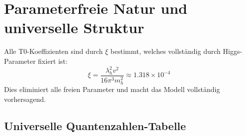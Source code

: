 	\section{Parameterfreie Natur und universelle Struktur}
	\label{sec:parameterfreie_natur}
	
	\begin{important}
		Alle T0-Koeffizienten sind durch $\xi$ bestimmt, welches vollständig durch Higgs-Parameter fixiert ist:
		\begin{equation}
			\xi = \frac{\lambda_h^2 v^2}{16\pi^3 m_h^2} \approx 1.318 \times 10^{-4}
		\end{equation}
		Dies eliminiert alle freien Parameter und macht das Modell vollständig vorhersagend.
	\end{important}
	
	\subsection{Universelle Quantenzahlen-Tabelle}
	\label{subsec:universal_quantum_table}
	
	\begin{table}[H]
		\centering
		\caption{Vollständige universelle Quantenzahlen-Tabelle für alle Fermionen}
		\label{tab:universal_quantum_numbers}
	\end{table}
	

